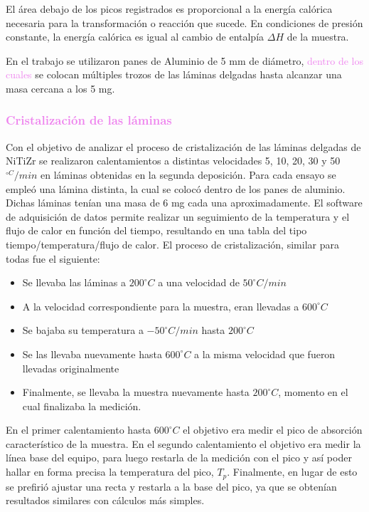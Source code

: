 \documentclass[12pt]{article}
\theoremstyle{definition}
\theoremstyle{remark}
\begin{document}
{El área debajo de los picos registrados es proporcional a la energía calórica necesaria para la transformación o reacción que sucede. En condiciones de presión constante, la energía calórica es igual al cambio de entalpía $\Delta H$ de la muestra.

En el trabajo se utilizaron panes de Aluminio de 5 mm de diámetro, \textcolor{violet}{dentro de los cuales} se colocan múltiples trozos de las láminas delgadas hasta alcanzar una masa cercana a los 5 mg.

\subsubsection{\textcolor{violet}{Cristalización de las láminas}}

Con el objetivo de analizar el proceso de cristalización de las láminas delgadas de NiTiZr se realizaron calentamientos a distintas velocidades 5, 10, 20, 30 y 50 $^{\circ C }/min$ en láminas obtenidas en la segunda deposición. Para cada ensayo se empleó una lámina distinta, la cual se colocó dentro de los panes de aluminio. Dichas láminas tenían una masa de 6 mg cada una aproximadamente. El software de adquisición de datos permite realizar un seguimiento de la temperatura y el flujo de calor en función del tiempo, resultando en una tabla del tipo tiempo/temperatura/flujo de calor. El proceso de cristalización, similar para todas fue el siguiente:

\begin{itemize}
\item Se llevaba las láminas a $200^{\circ}C$ a una velocidad de $50^{\circ}C/min$
\item A la velocidad correspondiente para la muestra, eran llevadas a $600^{\circ}C$
\item Se bajaba su temperatura a $-50^{\circ}C/min$ hasta $200^{\circ}C$
\item Se las llevaba nuevamente hasta $600^{\circ}C$ a la misma velocidad que fueron llevadas originalmente
\item Finalmente, se llevaba la muestra nuevamente hasta $200^{\circ}C$, momento en el cual finalizaba la medición.
\end{itemize}

En el primer calentamiento hasta $600^{\circ}C$ el objetivo era medir el pico de absorción característico de la muestra. En el segundo calentamiento el objetivo era medir la línea base del equipo, para luego restarla de la medición con el pico y así poder hallar en forma precisa la temperatura del pico, $T_p$. Finalmente, en lugar de esto se prefirió ajustar una recta y restarla a la base del pico, ya que se obtenían resultados similares con cálculos más simples.


}
\end{document}
